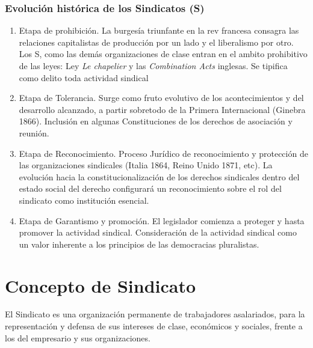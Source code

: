 \documentclass[spanish,12pt,a4paper,titlepage]{report}
\begin{document}
\subsubsection{Evolución histórica de los Sindicatos (S)}

\begin{enumerate}
\item Etapa de prohibición. La burgesía triunfante en la rev francesa consagra las relaciones capitalistas de producción por un lado y el liberalismo por otro. Los S, como las demás organizaciones de clase entran en el ambito prohibitivo de las leyes: Ley \textit{Le chapelier} y las \textit{Combination Acts} inglesas. Se tipifica como delito toda actividad sindical

\item Etapa de Tolerancia. Surge como fruto evolutivo de los acontecimientos y del desarrollo alcanzado, a partir sobretodo de la Primera Internacional (Ginebra 1866). Inclusión en algunas Constituciones de los derechos de asociación y reunión.

\item Etapa de Reconocimiento. Proceso Jurídico de reconocimiento y protección de las organizaciones sindicales (Italia 1864, Reino Unido 1871, etc). La evolución hacia la constitucionalización de los derechos sindicales dentro del estado social del derecho configurará un reconocimiento sobre el rol del sindicato como institución esencial.
\item Etapa de Garantismo y promoción. El legislador comienza a proteger y hasta promover la actividad sindical. Consideración de la actividad sindical como un valor inherente a los principios de las democracias pluralistas.  
\end{enumerate}


\section{Concepto de Sindicato}

El Sindicato es una organización permanente de trabajadores asalariados, para la representación y defensa de sus intereses de clase, económicos y sociales, frente a los del empresario y sus organizaciones.
\end{document}
